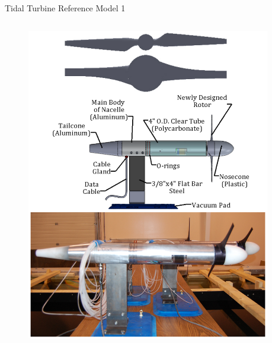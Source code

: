 \documentclass[xcolor=x11names,compress]{beamer}
\begin{document}
	\begin{frame}{Tidal Turbine Reference Model 1}

		\begin{columns}
		    
		    \begin{column}{0.45\textwidth}

		        \begin{figure}[p]
				    \centering
				    \includegraphics[width=1.1\textwidth]{figures/Nicks_turbines_redesign.png}
				\end{figure}

		    \end{column}
		    
		    \begin{column}{0.55\textwidth}
				

\end{column}
\end{columns}
\end{frame}
\end{document}
